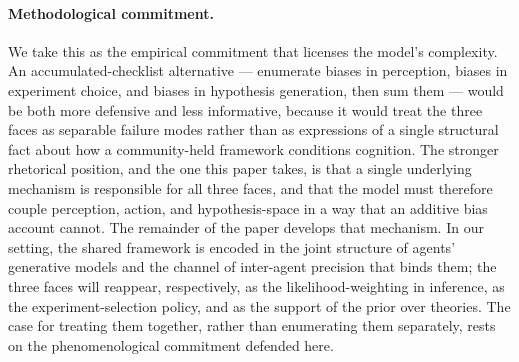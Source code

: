 \paragraph{Methodological commitment.}
We take this as the empirical commitment that licenses the model's
complexity. An accumulated-checklist alternative --- enumerate
biases in perception, biases in experiment choice, and biases in
hypothesis generation, then sum them --- would be both more
defensive and less informative, because it would treat the three
faces as separable failure modes rather than as expressions of a
single structural fact about how a community-held framework
conditions cognition. The stronger rhetorical position, and the one
this paper takes, is that a single underlying mechanism is
responsible for all three faces, and that the model must therefore
couple perception, action, and hypothesis-space in a way that an
additive bias account cannot. The remainder of the paper develops
that mechanism. In our setting, the
shared framework is encoded in the joint structure of agents'
generative models and the channel of inter-agent precision that
binds them; the three faces will reappear, respectively, as the
likelihood-weighting in inference, as the experiment-selection
policy, and as the support of the prior over theories. The case
for treating them together, rather than enumerating them
separately, rests on the phenomenological commitment defended
here.
